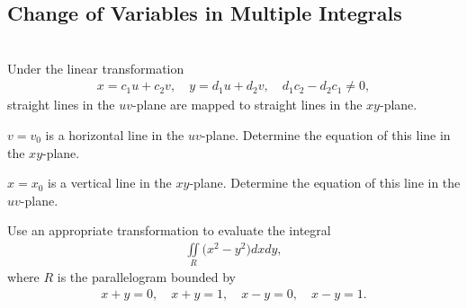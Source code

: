 \documentclass{article}
\begin{document}
\subsection{Change of Variables in Multiple Integrals}
\BEN
\item %
 \\
Under the linear transformation 
\begin{align*}
  x = c_1u + c_2v , \quad y =d_1u + d_2v, \quad d_1c_2 - d_2c_1 \ne 0,
\end{align*}
straight lines in the $uv$-plane are mapped to straight lines in the $xy$-plane. 
\BEN
\item $v=v_0$ is a horizontal line in the $uv$-plane. Determine the equation of this line in the $xy$-plane. 
\item $x=x_0$ is a vertical line in the $xy$-plane. Determine the equation of this line in the $uv$-plane.
\EEN
\item %
Use an appropriate transformation to evaluate the integral
\begin{align*}
  \iint\limits_R \big(x^2 - y^2\big) dxdy,
\end{align*}
where $R$ is the parallelogram bounded by 
\begin{align*}
  x+y = 0, \quad x+y = 1, \quad x-y=0, \quad x-y=1.
\end{align*}
\end{document}

